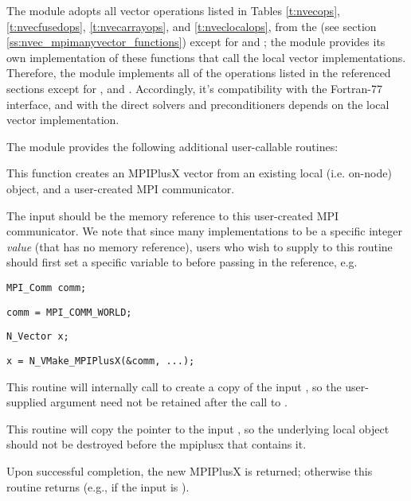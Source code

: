 The {\nvecmpiplusx} module adopts all vector operations listed
in Tables \ref{t:nvecops}, \ref{t:nvecfusedops}, \ref{t:nvecarrayops},
and \ref{t:nveclocalops}, from the {\nvecmpimanyvector} (see section
\ref{ss:nvec_mpimanyvector_functions}) except for 
and ; the module provides its own implementation
of these functions that call the local vector implementations. Therefore,
the {\nvecmpiplusx} module implements all of the operations listed in the
referenced sections except for , and
. Accordingly, it's compatibility
with the {\sundials} Fortran-77 interface, and with the {\sundials}
direct solvers and preconditioners depends on the local vector implementation.

The module {\nvecmpiplusx} provides the following additional
user-callable routines:
{
  This function creates an MPIPlusX vector from an existing local
  (i.e. on-node) {\nvector} object, and a user-created MPI communicator.

  The input  should be the memory reference to this
  user-created MPI communicator.  We note that since many {\mpi}
  implementations   to be a specific
  integer \emph{value} (that has no memory reference), users who wish
  to supply  to this routine should first
  set a specific  variable to 
  before passing in the reference, e.g.

  \hspace{0.5in} \texttt{MPI\_Comm comm;}\vspace{-0.5em}
  
  \hspace{0.5in} \texttt{comm = MPI\_COMM\_WORLD;}\vspace{-0.5em}
  
  \hspace{0.5in} \texttt{N\_Vector x;}\vspace{-0.5em}
  
  \hspace{0.5in} \texttt{x = N\_VMake\_MPIPlusX(\&comm, ...);}

  This routine will internally call  to create a
  copy of the input , so the user-supplied  argument
  need not be retained after the call to .

  This routine will copy the  pointer to the input
  , so the underlying local {\nvector} object
  should not be destroyed before the mpiplusx that contains it.

  Upon successful completion, the new MPIPlusX is returned;
  otherwise this routine returns  (e.g., if the input
   is ).
}
